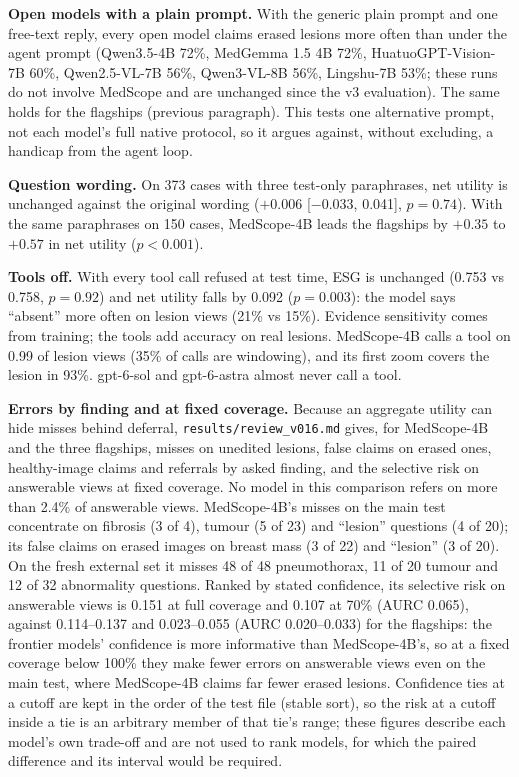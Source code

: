 \documentclass[11pt]{article}
\begin{document}
\textbf{Open models with a plain prompt.} With the generic plain prompt and one free-text reply, every open model claims erased lesions more often than under the agent prompt (Qwen3.5-4B 72\%, MedGemma 1.5 4B 72\%, HuatuoGPT-Vision-7B 60\%, Qwen2.5-VL-7B 56\%, Qwen3-VL-8B 56\%, Lingshu-7B 53\%; these runs do not involve MedScope and are unchanged since the v3 evaluation). The same holds for the flagships (previous paragraph). This tests one alternative prompt, not each model's full native protocol, so it argues against, without excluding, a handicap from the agent loop.

\textbf{Question wording.} On 373 cases with three test-only paraphrases, net utility is unchanged against the original wording ($+0.006$ [$-0.033$, 0.041], $p=0.74$). With the same paraphrases on 150 cases, MedScope-4B leads the flagships by $+0.35$ to $+0.57$ in net utility ($p<0.001$).

\textbf{Tools off.} With every tool call refused at test time, ESG is unchanged (0.753 vs 0.758, $p=0.92$) and net utility falls by 0.092 ($p=0.003$): the model says ``absent'' more often on lesion views (21\% vs 15\%). Evidence sensitivity comes from training; the tools add accuracy on real lesions. MedScope-4B calls a tool on 0.99 of lesion views (35\% of calls are windowing), and its first zoom covers the lesion in 93\%. gpt-6-sol and gpt-6-astra almost never call a tool.

\textbf{Errors by finding and at fixed coverage.} Because an aggregate utility can hide misses behind deferral, \texttt{results/review\_v016.md} gives, for MedScope-4B and the three flagships, misses on unedited lesions, false claims on erased ones, healthy-image claims and referrals by asked finding, and the selective risk on answerable views at fixed coverage. No model in this comparison refers on more than 2.4\% of answerable views. MedScope-4B's misses on the main test concentrate on fibrosis (3 of 4), tumour (5 of 23) and ``lesion'' questions (4 of 20); its false claims on erased images on breast mass (3 of 22) and ``lesion'' (3 of 20). On the fresh external set it misses 48 of 48 pneumothorax, 11 of 20 tumour and 12 of 32 abnormality questions. Ranked by stated confidence, its selective risk on answerable views is 0.151 at full coverage and 0.107 at 70\% (AURC 0.065), against 0.114--0.137 and 0.023--0.055 (AURC 0.020--0.033) for the flagships: the frontier models' confidence is more informative than MedScope-4B's, so at a fixed coverage below 100\% they make fewer errors on answerable views even on the main test, where MedScope-4B claims far fewer erased lesions. Confidence ties at a cutoff are kept in the order of the test file (stable sort), so the risk at a cutoff inside a tie is an arbitrary member of that tie's range; these figures describe each model's own trade-off and are not used to rank models, for which the paired difference and its interval would be required.
\end{document}
